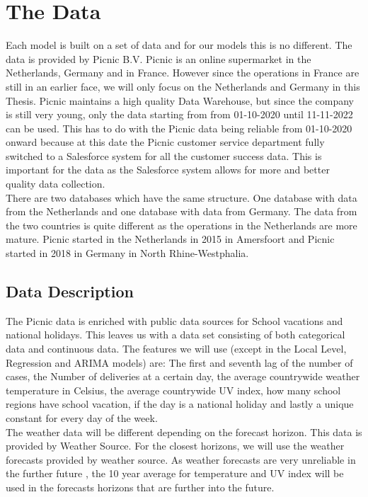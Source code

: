 \section{The Data}
\label{seq:the data}
Each model is built on a set of data and for our models this is no different. The data is provided by Picnic B.V. Picnic is an online supermarket in the Netherlands, Germany and in France. However since the operations in France are still in an earlier face, we will only focus on the Netherlands and Germany in this Thesis. Picnic maintains a high quality Data Warehouse, but since the company is still very young, only the data starting from  from 01-10-2020 until 11-11-2022 can be used. This has to do with the Picnic data being reliable from 01-10-2020 onward because at this date the Picnic customer service department fully switched to a Salesforce system for all the customer success data. This is important for the data as the Salesforce system allows for more and better quality data collection.\\

There are two databases which have the same structure. One database with data from the Netherlands and one database with data from Germany. The data from the two countries is quite different as the operations in the Netherlands are more mature. Picnic started in the Netherlands in 2015 in Amersfoort and Picnic started in 2018 in Germany in North Rhine-Westphalia.

\subsection{Data Description}
The Picnic data is enriched with public data sources for School vacations and national holidays. This leaves us with a data set consisting of both categorical data and continuous data. The features we will use (except in the Local Level, Regression and ARIMA models) are: The first and seventh lag of the number of cases, the Number of deliveries at a certain day, the average countrywide weather temperature in Celsius, the average countrywide UV index, how many school regions have school vacation, if the day is a national holiday and lastly a unique constant for every day of the week.\\

The weather data will be different depending on the forecast horizon. This data is provided by Weather Source. For the closest horizons, we will use the weather forecasts provided by weather source. As weather forecasts are very unreliable in the further future \citep{Scher2018PredictingLearning}, the 10 year average for temperature and UV index will be used in the forecasts horizons that are further into the future.\\

